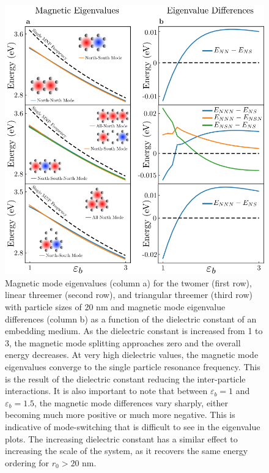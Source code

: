 \documentclass[journal=ancac3,manuscript=article]{achemso}
\begin{document}
\begin{figure}
\centering
\includegraphics[width=.6\paperwidth]{dielectric_study.png}
\caption{Magnetic mode eigenvalues (column a) for the twomer (first row), linear threemer (second row), and triangular threemer (third row) with particle sizes of 20 nm and magnetic mode eigenvalue differences (column b) as a function of the dielectric constant of an embedding medium. As the dielectric constant is increased from 1 to 3, the magnetic mode splitting approaches zero and the overall energy decreases. At very high dielectric values, the magnetic mode eigenvalues converge to the single particle resonance frequency. This is the result of the dielectric constant reducing the inter-particle interactions. It is also important to note that between $\varepsilon_b = 1$ and $\varepsilon_b = 1.5$, the magnetic mode differences vary sharply, either becoming much more positive or much more negative. This is indicative of mode-switching that is difficult to see in the eigenvalue plots. The increasing dielectric constant has a similar effect to increasing the scale of the system, as it recovers the same energy ordering for $r_0 > 20$ nm.}
\label{dielectric}
\end{figure}
\end{document}
